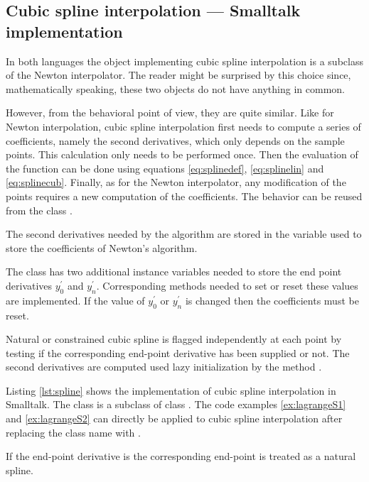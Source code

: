 \subsection{Cubic spline interpolation --- Smalltalk  implementation}
In both languages the object implementing cubic spline interpolation is a subclass of the
Newton interpolator. The reader might be surprised by this choice
since, mathematically speaking, these two objects do not have
anything in common.

However, from the behavioral point of view, they are quite
similar. Like for Newton interpolation, cubic spline interpolation
first needs to compute a series of coefficients, namely the second
derivatives, which only depends on the sample points. This
calculation only needs to be performed once. Then the evaluation
of the function can be done using equations \ref{eq:splinedef},
\ref{eq:splinelin} and \ref{eq:splinecub}. Finally, as for the
Newton interpolator, any modification of the points requires a new
computation of the coefficients. The behavior can be reused from
the class .

The second derivatives needed by the algorithm are stored in the
variable used to store the coefficients of Newton's algorithm.

The class  has two additional instance
variables needed to store the end point derivatives $y^{\prime}_0$
and $y^{\prime}_n$. Corresponding methods needed to set or reset
these values are implemented. If the value of $y^{\prime}_0$ or
$y^{\prime}_n$ is changed then the coefficients must be reset.

Natural or constrained cubic spline is flagged independently at
each point by testing if the corresponding end-point derivative
has been supplied or not. The second derivatives are computed used
lazy initialization by the method .

Listing \ref{lst:spline} shows the implementation of cubic spline
interpolation in Smalltalk. The class 
is a subclass of class . The code
examples \ref{ex:lagrangeS1} and \ref{ex:lagrangeS2} can directly
be applied to cubic spline interpolation after replacing the class
name  with .

If the end-point derivative is  the corresponding
end-point is treated as a natural spline.

